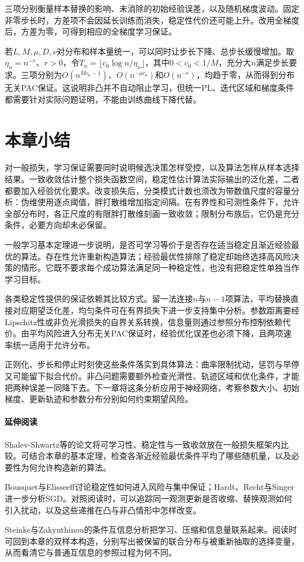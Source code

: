 三项分别衡量样本替换的影响、未消除的初始经验误差，以及随机梯度波动。固定非零步长时，方差项不会因延长训练而消失，稳定性代价还可能上升。改用全梯度后，方差为零，可得到相应的全梯度学习保证。

若$L,M,\mu,D,\nu$对分布和样本量统一，可以同时让步长下降、总步长缓慢增加。取$\eta_n=n^{-r}$、$r>0$，令$T_n=\lfloor c_0\log n/\eta_n\rfloor$，其中$0<c_0<1/M$，充分大$n$满足步长要求。三项分别为$O(n^{Mc_0-1})$、$O(n^{-\mu c_0})$和$O(n^{-r})$，均趋于零，从而得到分布无关PAC保证。这说明非凸并不自动阻止学习，但统一PL、迭代区域和梯度条件都需要针对实际问题证明，不能由训练曲线下降代替。

\section{本章小结}
\label{sec:general-learning-summary}

对一般损失，学习保证需要同时说明候选决策怎样受控，以及算法怎样从样本选择结果。一致收敛估计整个损失函数空间，稳定性估计算法实际输出的泛化差，二者都要加入经验优化要求。改变损失后，分类模式计数也须改为带数值尺度的容量分析：伪维使用逐点阈值，胖打散维增加指定间隔。在有界性和可测性条件下，允许全部分布时，各正尺度的有限胖打散维刻画一致收敛；限制分布族后，它仍是充分条件，必要方向却未必保留。

一般学习基本定理进一步说明，是否可学习等价于是否存在适当稳定且渐近经验最优的算法。存在性允许重新构造算法；经验最优性排除了稳定却始终选择高风险决策的情形。它既不要求每个成功算法满足同一种稳定性，也没有把稳定性单独当作学习目标。

各类稳定性提供的保证依赖其比较方式。留一法连接$n$与$n-1$项算法，平均替换直接对应期望泛化差，均匀条件可在有界损失下进一步支持集中分析。参数距离要经Lipschitz性或非负光滑损失的自界关系转换，信息量则通过参照分布控制依赖代价。由平均风险进入分布无关PAC保证时，经验优化误差也必须下降，且两项速率统一适用于允许分布。

正则化、步长和停止时刻使这些条件落实到具体算法：曲率限制扰动，惩罚与早停又可能留下拟合代价。非凸问题需要额外检查光滑性、轨迹区域和优化条件，才能把两种误差一同降下去。下一章将这条分析应用于神经网络，考察参数大小、初始梯度、更新轨迹和参数分布分别如何约束期望风险。

\paragraph{延伸阅读}
Shalev-Shwartz等的论文将可学习性、稳定性与一致收敛放在一般损失框架内比较。可结合本章的基本定理，检查各渐近经验最优条件平均了哪些随机量，以及必要性为何允许构造新的算法。

Bousquet与Elisseeff讨论稳定性如何进入风险与集中保证；Hardt、Recht与Singer进一步分析SGD。对照阅读时，可以追踪同一观测更新是否收缩、替换观测如何引入扰动，以及这些递推在凸与非凸情形中怎样改变。

Steinke与Zakynthinou的条件互信息分析把学习、压缩和信息量联系起来。阅读时可回到本章的双样本构造，分别写出被保留的联合分布与被重新抽取的选择变量，从而看清它与普通互信息的参照过程为何不同。